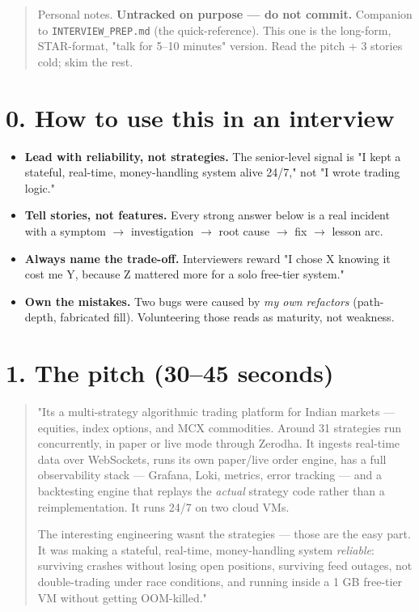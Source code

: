 \documentclass[11pt]{article}
\providecommand{\tightlist}{\setlength{\itemsep}{1pt}\setlength{\parskip}{0pt}}
\begin{document}
\makecoverpage

\thispagestyle{empty}
{\hypersetup{hidelinks}\tableofcontents}
\clearpage

\begin{quote}
Personal notes. \textbf{Untracked on purpose --- do not commit.}
Companion to \texttt{INTERVIEW\_PREP.md} (the quick-reference). This one is the long-form,
STAR-format, "talk for 5--10 minutes" version. Read the pitch + 3 stories cold;
skim the rest.
\end{quote}

\section{0. How to use this in an interview}\label{0-how-to-use-this-in-an-interview}

\begin{itemize}
\tightlist
\item
  \textbf{Lead with reliability, not strategies.} The senior-level signal is "I kept a
  stateful, real-time, money-handling system alive 24/7," not "I wrote trading logic."
\item
  \textbf{Tell stories, not features.} Every strong answer below is a real incident with a
  symptom \(\rightarrow\) investigation \(\rightarrow\) root cause \(\rightarrow\) fix \(\rightarrow\) lesson arc.
\item
  \textbf{Always name the trade-off.} Interviewers reward "I chose X knowing it cost me Y,
  because Z mattered more for a solo free-tier system."
\item
  \textbf{Own the mistakes.} Two bugs were caused by \emph{my own refactors} (path-depth, fabricated
  fill). Volunteering those reads as maturity, not weakness.
\end{itemize}

\section{1. The pitch (30--45 seconds)}\label{1-the-pitch-3045-seconds}

\begin{quote}
"It\textquotesingle s a multi-strategy algorithmic trading platform for Indian markets --- equities, index
options, and MCX commodities. Around 31 strategies run concurrently, in paper or live mode
through Zerodha. It ingests real-time data over WebSockets, runs its own paper/live order
engine, has a full observability stack --- Grafana, Loki, metrics, error tracking --- and a
backtesting engine that replays the \emph{actual} strategy code rather than a reimplementation.
It runs 24/7 on two cloud VMs.

The interesting engineering wasn\textquotesingle t the strategies --- those are the easy part. It was making
a stateful, real-time, money-handling system \emph{reliable}: surviving crashes without losing
open positions, surviving feed outages, not double-trading under race conditions, and
running inside a 1 GB free-tier VM without getting OOM-killed."
\end{quote}
\end{document}

